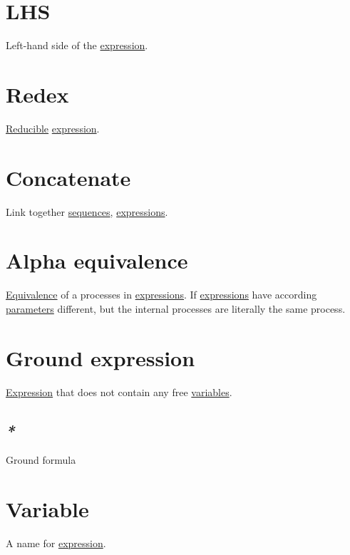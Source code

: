 \documentclass[a4paper,14pt,oneside]{book}
\begin{document}
\section{\label{org865f38e}LHS}
\label{sec:org41156b7}
Left-hand side of the \hyperref[org4eaaefd]{expression}.\\

\section{\label{orgf1b016d}Redex}
\label{sec:org790d2f5}
\hyperref[orgd7e2715]{Reducible} \hyperref[org4eaaefd]{expression}.\\

\section{\label{orgfdb8516}Concatenate}
\label{sec:org966a51f}
Link together \hyperref[org581f8c7]{sequences}, \hyperref[orgf28b2f4]{expressions}.\\

\section{\label{org7ae4479}Alpha equivalence}
\label{sec:orga7fd593}
\hyperref[orga6050b4]{Equivalence} of a processes in \hyperref[orgf28b2f4]{expressions}. If \hyperref[orgf28b2f4]{expressions} have according \hyperref[orgeb28a78]{parameters} different, but the internal processes are literally the same process.\\

\section{\label{org1f83702}Ground expression}
\label{sec:orgaa8953d}
\hyperref[org4eaaefd]{Expression} that does not contain any free \hyperref[org1f76999]{variables}.\\

\subsection{\emph{*}}
\label{sec:org068a2bc}

\label{org55f48af}Ground formula\\

\section{\label{org4af7747}Variable}
\label{sec:org8206b3a}
A name for \hyperref[org4eaaefd]{expression}.\\
\end{document}
